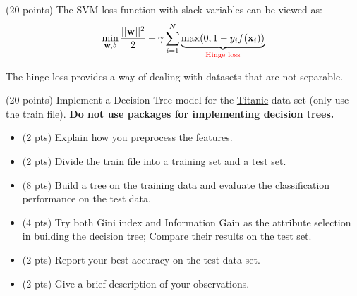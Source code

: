 \documentclass{exam}
\newcommand{\xx}{{\bf{x}}}
\newcommand{\ww}{{\bf{w}}}
\begin{document}
\begin{questions}
\newpage
{}\label{q1} (20 points) The SVM loss function with slack variables can be viewed as:
	\begin{align}
		      \min_{\mathbf{w},b} \frac{ ||\mathbf{w}||^2}{2} + \gamma \sum_{i=1}^N \underbrace{\max(0, 1- y_i f(\xx_i))}_{\textcolor{red}{\text{Hinge loss}}}
		\end{align}

The hinge loss provides a way of dealing with datasets that are not separable.


\newpage
{} (20 points) Implement a Decision Tree model for the \href{https://www.kaggle.com/c/titanic/data}{Titanic} data set (only use the train file). \textbf{Do not use packages for implementing decision trees.}
\begin{itemize}
\item (2 pts) Explain how you preprocess the features.
\item (2 pts) Divide the train file into a training set and a test set.
\item (8 pts) Build a tree on the training data and evaluate the classification performance on the test data.
\item (4 pts) Try both Gini index and Information Gain as the attribute selection in building the decision tree; Compare their results on the test set.
\item (2 pts) Report your best accuracy on the test data set.
\item (2 pts) Give a brief description of your observations.
\end{itemize}


\end{questions}
\end{document}
